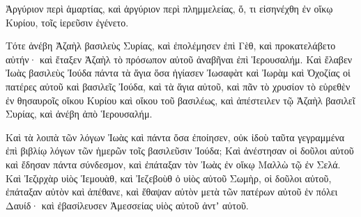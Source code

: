 {Ἀργύριον περὶ ἁμαρτίας, καὶ ἀργύριον περὶ πλημμελείας, ὅ, τι εἰσηνέχθη ἐν οἴκῳ Κυρίου, τοῖς ἱερεῦσιν ἐγένετο.
\par }{\PP {}Τότε ἀνέβη Ἀζαὴλ βασιλεὺς Συρίας, καὶ ἐπολέμησεν ἐπὶ Γὲθ, καὶ προκατελάβετο αὐτήν· καὶ ἔταξεν Ἀζαὴλ τὸ πρόσωπον αὐτοῦ ἀναβῆναι ἐπὶ Ἱερουσαλήμ.
Καὶ ἔλαβεν Ἰωὰς βασιλεὺς Ἰούδα πάντα τὰ ἅγια ὅσα ἡγίασεν Ἰωσαφὰτ καὶ Ἰωρὰμ καὶ Ὀχοζίας οἱ πατέρες αὐτοῦ καὶ βασιλεῖς Ἰούδα, καὶ τὰ ἅγια αὐτοῦ, καὶ πᾶν τὸ χρυσίον τὸ εὑρεθὲν ἐν θησαυροῖς οἴκου Κυρίου καὶ οἴκου τοῦ βασιλέως, καὶ ἀπέστειλεν τῷ Ἀζαὴλ βασιλεῖ Συρίας, καὶ ἀνέβη ἀπὸ Ἱερουσαλήμ.
\par }{\PP {}Καὶ τὰ λοιπὰ τῶν λόγων Ἰωὰς καὶ πάντα ὅσα ἐποίησεν, οὐκ ἰδοὺ ταῦτα γεγραμμένα ἐπὶ βιβλίῳ λόγων τῶν ἡμερῶν τοῖς βασιλεῦσιν Ἰούδα;
Καὶ ἀνέστησαν οἱ δοῦλοι αὐτοῦ καὶ ἔδησαν πάντα σύνδεσμον, καὶ ἐπάταξαν τὸν Ἰωὰς ἐν οἴκῳ Μαλλὼ τῷ ἐν Σελά.
Καὶ Ἰεζιρχὰρ υἱὸς Ἱεμουὰθ, καὶ Ἰεζεβοὺθ ὁ υἱὸς αὐτοῦ Σωμὴρ, οἱ δοῦλοι αὐτοῦ, ἐπάταξαν αὐτὸν καὶ ἀπέθανε, καὶ ἔθαψαν αὐτὸν μετὰ τῶν πατέρων αὐτοῦ ἑν πόλει Δαυίδ· καὶ ἐβασίλευσεν Ἀμεσσείας υἱὸς αὐτοῦ ἀντʼ αὐτοῦ.

}
